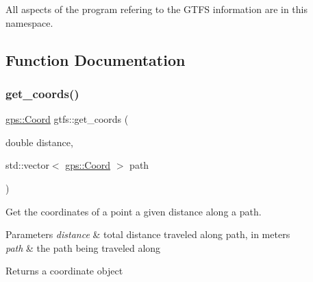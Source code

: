 All aspects of the program refering to the G\+T\+FS information are in this namespace. 

\subsection{Function Documentation}
\mbox{\label{namespacegtfs_aab5513b6c15b5c30de5f706a2e587ae4}} 
\subsubsection{\texorpdfstring{get\+\_\+coords()}{get\_coords()}}
{\footnotesize\ttfamily \hyperlink{classgps_1_1Coord}{gps\+::\+Coord} gtfs\+::get\+\_\+coords (\begin{DoxyParamCaption}\item[{double}]{distance,  }\item[{std\+::vector$<$ \hyperlink{classgps_1_1Coord}{gps\+::\+Coord} $>$}]{path }\end{DoxyParamCaption})}

Get the coordinates of a point a given distance along a path. 
\begin{DoxyParams}{Parameters}
{\em distance} & total distance traveled along path, in meters \\
\hline
{\em path} & the path being traveled along \\
\hline
\end{DoxyParams}
\begin{DoxyReturn}{Returns}
a coordinate object 
\end{DoxyReturn}

